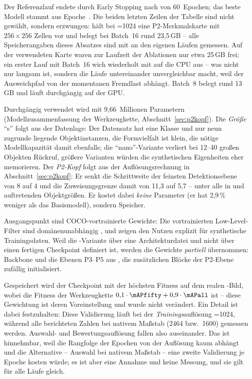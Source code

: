 Der Referenzlauf endete durch Early Stopping nach \zrefEpochen{} von
60~Epochen; das beste Modell stammt aus Epoche~\zrefBestEpoche. Die beiden
letzten Zeilen der Tabelle sind nicht gewählt, sondern erzwungen: 
hält bei =1024 eine P2-Merkmalskarte mit $256\times256$ Zellen vor und
belegt bei Batch~16 rund 23,5\,GB -- alle Speicherangaben dieses Absatzes sind
mit  an den eigenen Läufen gemessen. Auf der verwendeten Karte waren zur Laufzeit
der Ablationen nur etwa 25\,GB frei; ein erster Lauf mit Batch~16 wich wiederholt
mit  auf die CPU aus -- was
nicht nur langsam ist, sondern die Läufe untereinander unvergleichbar macht, weil
der Ausweichpfad von der momentanen Fremdlast abhängt. Batch~8 belegt rund
13\,GB und läuft durchgängig auf der GPU.

 Durchgängig verwendet wird  mit
9,66~Millionen Parametern (Modellzusammenfassung der Werkzeugkette,
Abschnitt~\ref{sec:p2kopf}). Die \emph{Größe} \enquote{s} folgt aus der Datenlage:
Der Datensatz hat eine Klasse und nur neun zugrunde liegende Objektinstanzen, die
Formvielfalt ist klein, die nötige Modellkapazität damit ebenfalls; die
\enquote{nano}-Variante verliert bei 12--40\px{} großen Objekten Rückruf, größere
Varianten würden die synthetischen Eigenheiten eher memorieren. Der \emph{P2-Kopf}
folgt aus der Auflösungsrechnung in Abschnitt~\ref{sec:p2kopf}: Er senkt die
Schrittweite der feinsten Detektionsebene von 8 auf 4 und die Zuweisungsgrenze
damit von 11,3 auf 5,7\px{} -- unter alle in  und 
auftretenden Objektgrößen. Er kostet dabei \emph{keine} Parameter (er hat 2,9\,\%
weniger als das Basismodell), sondern Speicher.

Ausgangspunkt sind COCO-vortrainierte Gewichte: Die vortrainierten
Low-Level-Filter sind domänenunabhängig \parencite{yosinski2014}, und
\textcite{hinterstoisser2018} zeigen den Nutzen explizit für synthetische
Trainingsdaten. Weil die -Variante über eine Architekturdatei und nicht
über einen fertigen Checkpoint definiert ist, werden die Gewichte
\emph{partiell} übernommen: Backbone und die Ebenen P3--P5 aus ,
die zusätzlichen Blöcke der P2-Ebene zufällig initialisiert.

 Gespeichert wird der Checkpoint mit der höchsten
Fitness auf dem realen -Bild, wobei die Fitness der Werkzeugkette
$0{,}1 \cdot \mAPfifty + 0{,}9 \cdot \mAPall$ ist -- diese Gewichtung ist deren
Voreinstellung und wurde nicht verändert. Ein Detail ist dabei
festzuhalten: Diese Validierung läuft bei der \emph{Trainings}auflösung
=1024, während alle berichteten Zahlen bei nativem Maßstab (2464
bzw.\ 1600) gemessen werden. Auswahl- und Bewertungsauflösung fallen also
auseinander. Das ist hinnehmbar, weil die Rangfolge der Epochen von der
Auflösung kaum abhängt und die Alternative -- Auswahl bei nativem Maßstab --
eine zweite Validierung je Epoche kosten würde; es ist aber eine Annahme und
keine Messung, und sie gilt für alle Läufe gleich.

